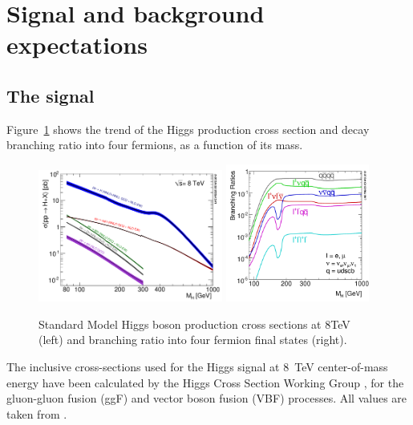 \section{Signal and background expectations}
\label{sec:MCexpectations}


\subsection {The signal}


Figure~\ref{fig:higgsXSBR} shows the trend of the Higgs production cross section and decay branching ratio into four fermions, 
as a function of its mass.
%
\begin{figure}[htb] 
  {\centering
    \includegraphics[width=0.54\textwidth]{plots/limitplot/Higgs_XS_8TeV.pdf}
    \includegraphics[width=0.42\textwidth]{plots/limitplot/Higgs_BR_4fermion_1.pdf}
    \caption{Standard Model Higgs boson production cross sections at 8TeV (left) and branching ratio into four fermion final states (right).}
    \label{fig:higgsXSBR}}
\end{figure}
%
The inclusive cross-sections used for the Higgs signal at 8~TeV
center-of-mass energy have been calculated by the Higgs Cross Section
Working Group
\cite{LHCHiggsCrossSectionWorkingGroup:2011ti},\cite{Dittmaier:2012vm}
for the gluon-gluon fusion (ggF) and vector boson fusion (VBF)
processes.  All values are taken from \cite{cite:higgsxsecbr}.


